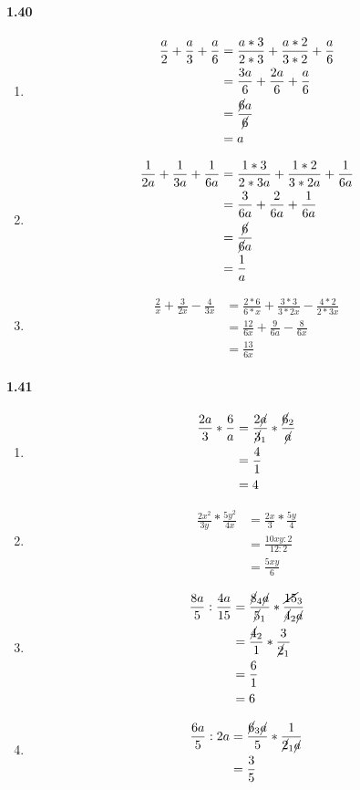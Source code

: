 \documentclass{article}
\newcommand\litem[1]{\item{\bfseries#1\space}}
\begin{document}
\paragraph{1.40}
\begin{enumerate}[label=\emph{\alph*})]
\litem{
\begin{align*}
  \frac{a}{2} + \frac{a}{3} + \frac{a}{6} &= \frac{a*3}{2*3} + \frac{a*2}{3*2} + \frac{a}{6} \\
  &= \frac{3a}{6} + \frac{2a}{6} + \frac{a}{6} \\
  &= \frac{\cancel{6} a}{\cancel{6}} \\
  &= a
\end{align*}
}
\litem{
\begin{align*}
  \frac{1}{2a} + \frac{1}{3a} + \frac{1}{6a} &= \frac{1*3}{2*3a} + \frac{1*2}{3*2a} + \frac{1}{6a} \\
  &= \frac{3}{6a} + \frac{2}{6a} + \frac{1}{6a} \\
  &= \frac{\cancel{6}}{\cancel{6} a} \\
  &= \frac{1}{a}
\end{align*}
}
\litem{
\begin{align*}
  \frac{2}{x} + \frac{3}{2x} - \frac{4}{3x} &= \frac{2*6}{6*x} + \frac{3*3}{3*2x} - \frac{4*2}{2*3x} \\
  &= \frac{12}{6x} + \frac{9}{6a} - \frac{8}{6x} \\
  &= \frac{13}{6x}
\end{align*}
}
\end{enumerate}

\paragraph{1.41}
\begin{enumerate}[label=\emph{\alph*})]
\litem{
\begin{align*}
  \frac{2a}{3} * \frac{6}{a} &= \frac{2\cancel{a}}{\cancel{3}_1} * \frac{\cancel{6}_2}{\cancel{a}} \\
  &= \frac{4}{1} \\
  &= 4
\end{align*}
}
\litem{
\begin{align*}
  \frac{2x^2}{3y} * \frac{5y^2}{4x} &= \frac{2x}{3} * \frac{5y}{4} \\
  &= \frac{10xy:2}{12:2} \\
  &= \frac{5xy}{6}
\end{align*}
}
\litem{
\begin{align*}
  \frac{8a}{5} : \frac{4a}{15} &= \frac{\cancel{8}_4\cancel{a}}{\cancel{5}_1} * \frac{\cancel{15}_3}{\cancel{4}_2\cancel{a}} \\
  &= \frac{\cancel{4}_2}{1} * \frac{3}{\cancel{2}_1} \\
  &= \frac{6}{1} \\
  &= 6
\end{align*}
}
\litem{
\begin{align*}
  \frac{6a}{5} : 2a &= \frac{\cancel{6}_3\cancel{a}}{5} * \frac{1}{\cancel{2}_1\cancel{a}} \\
  &= \frac{3}{5}
\end{align*}
}
\end{enumerate}
\end{document}
